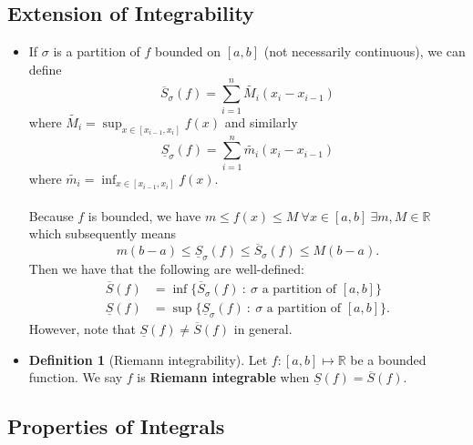 \documentclass{article}
\newcommand{\R}{\mathbb{R}}
\newcommand{\?}{\stackrel{?}{=}}
\theoremstyle{definition} %
\newtheorem{definition}[theorem]{Definition} %
\begin{document}
\subsection{Extension of Integrability}

\begin{itemize}
    \item If $\sigma$ is a partition of $f$ bounded on $[a, b]$ (not necessarily continuous), we can define
    $$\overline{S}_\sigma(f) = \sum_{i = 1}^n \widetilde{M_i}(x_i - x_{i - 1})$$
    where $\widetilde{M_i} = \sup_{x \in [x_{i - 1}, x_{i}]} f(x)$ and similarly
    $$\underline{S}_\sigma(f) = \sum_{i = 1}^n \widetilde{m_i}(x_i - x_{i - 1})$$
    where $\widetilde{m_i} = \inf_{x \in [x_{i - 1}, x_i]} f(x)$. \\\\
    Because $f$ is bounded, we have $m \leq f(x) \leq M \ \forall x \in [a, b] \ \exists m, M \in \R$ which subsequently means
    $$m(b - a) \leq \underline{S}_{\sigma}(f) \leq \overline{S}_{\sigma}(f) \leq M(b - a).$$
    Then we have that the following are well-defined:
    \begin{align*}
        \overline{S}(f) &= \inf\{\overline{S}_{\sigma}(f) \ : \ \sigma \text{ a partition of } [a, b]\} \\
        \underline{S}(f) &= \sup\{\underline{S}_{\sigma}(f) \ : \ \sigma \text{ a partition of } [a, b]\}.
    \end{align*}
    However, note that $\underline{S}(f) \neq \overline{S}(f)$ in general.
    \item[]
    \begin{definition}[Riemann integrability]
        Let $f: [a, b] \mapsto \R$ be a bounded function. We say $f$ is \textbf{Riemann integrable} when $\underline{S}(f) = \overline{S}(f)$.
    \end{definition}
\end{itemize}

\subsection{Properties of Integrals}
\end{document}
